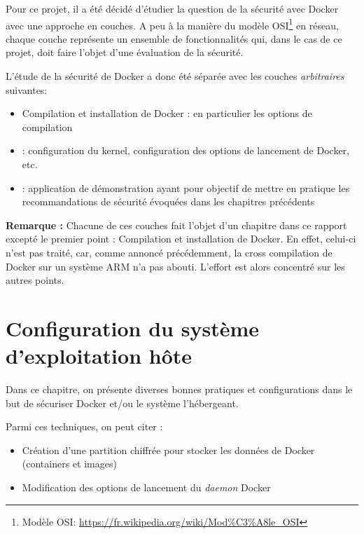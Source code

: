 \documentclass[11pt,a4paper,oneside]{report}
\begin{document}
Pour ce projet, il a été décidé d'étudier la question de la sécurité avec Docker avec une approche en couches. A peu à la manière du modèle OSI\footnote{Modèle OSI: \url{https://fr.wikipedia.org/wiki/Mod\%C3\%A8le_OSI}} en réseau, chaque couche représente un ensemble de fonctionnalités qui, dans le cas de ce projet, doit faire l'objet d'une évaluation de la sécurité.

L'étude de la sécurité de Docker a donc été séparée avec les couches \textit{arbitraires} suivantes:

\begin{itemize}

\item Compilation et installation de Docker : en particulier les options  de compilation

\item {} : configuration du kernel, configuration des options de lancement de Docker, etc.

\item {} : application de démonstration ayant pour objectif de mettre en pratique les recommandations de sécurité évoquées dans les chapitres précédents

\end{itemize}

\textbf{Remarque : } Chacune de ces couches fait l'objet d'un chapitre dans ce rapport excepté le premier point : Compilation et installation de Docker. En effet, celui-ci n'est pas traité, car, comme annoncé précédemment, la cross compilation de Docker sur un système ARM n'a pas abouti. L'effort est alors concentré sur les autres points.


\chapter{Configuration du système d'exploitation hôte}\label{config_systeme_os_hote}
Dans ce chapitre, on présente diverses bonnes pratiques et configurations dans le but de sécuriser Docker et/ou le système l'hébergeant.

Parmi ces techniques, on peut citer :

\begin{itemize}
\item Création d'une partition chiffrée pour stocker les données de Docker (containers et images)
\item Modification des options de lancement du \textit{daemon} Docker
\end{itemize}
\end{document}
